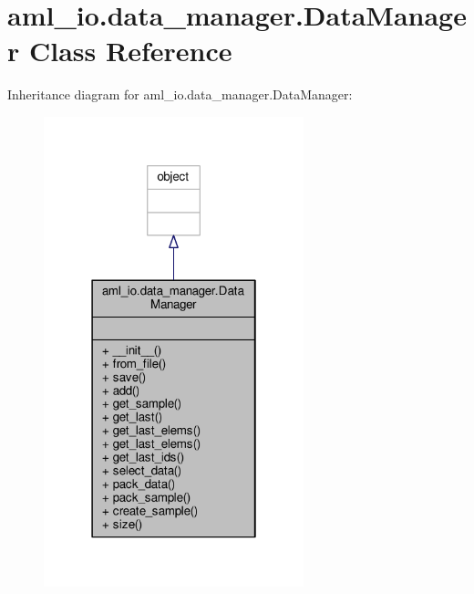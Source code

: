 \hypertarget{classaml__io_1_1data__manager_1_1_data_manager}{\section{aml\-\_\-io.\-data\-\_\-manager.\-Data\-Manager Class Reference}
\label{classaml__io_1_1data__manager_1_1_data_manager}
}


Inheritance diagram for aml\-\_\-io.\-data\-\_\-manager.\-Data\-Manager\-:\nopagebreak
\begin{figure}[H]
\begin{center}
\leavevmode
\includegraphics[width=214pt]{classaml__io_1_1data__manager_1_1_data_manager__inherit__graph}
\end{center}
\end{figure}


